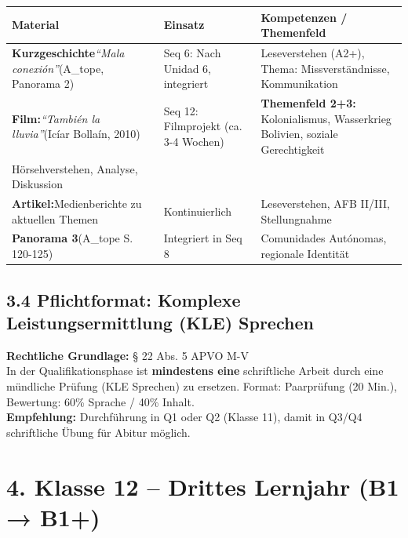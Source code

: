 \documentclass[11pt, a4paper]{article}
\newcommand{\es}[1]{\textit{#1}}
\begin{document}
\begin{tabularx}{\textwidth}{|L{3cm}|L{4cm}|X|}
\hline
{}
\textbf{Material} & \textbf{Einsatz} & \textbf{Kompetenzen / Themenfeld} \\
\hline
\textbf{Kurzgeschichte}\newline \es{``Mala conexión''}\newline (A\_tope, Panorama 2) &
Seq 6: Nach Unidad 6, integriert &
Leseverstehen (A2+), Thema: Missverständnisse, Kommunikation \\
\hline
\textbf{Film:}\newline \es{``También la lluvia''}\newline (Icíar Bollaín, 2010) &
Seq 12: Filmprojekt (ca. 3-4 Wochen) &
\textbf{Themenfeld 2+3:} Kolonialismus, Wasserkrieg Bolivien, soziale Gerechtigkeit\\
Hörsehverstehen, Analyse, Diskussion \\
\hline
\textbf{Artikel:}\newline Medienberichte zu aktuellen Themen &
Kontinuierlich &
Leseverstehen, AFB II/III, Stellungnahme \\
\hline
\textbf{Panorama 3}\newline (A\_tope S. 120-125) &
Integriert in Seq 8 &
Comunidades Autónomas, regionale Identität \\
\hline
\end{tabularx}

\subsection*{3.4 Pflichtformat: Komplexe Leistungsermittlung (KLE) Sprechen}

\begin{infobox}
\textbf{Rechtliche Grundlage:} § 22 Abs. 5 APVO M-V\\[4pt]
In der Qualifikationsphase ist \textbf{mindestens eine} schriftliche Arbeit durch eine mündliche Prüfung (KLE Sprechen) zu ersetzen. Format: Paarprüfung (20 Min.), Bewertung: 60\% Sprache / 40\% Inhalt.\\[4pt]
\textbf{Empfehlung:} Durchführung in Q1 oder Q2 (Klasse 11), damit in Q3/Q4 schriftliche Übung für Abitur möglich.
\end{infobox}


\newpage
\section*{4. Klasse 12 -- Drittes Lernjahr (B1 → B1+)}
\end{document}
